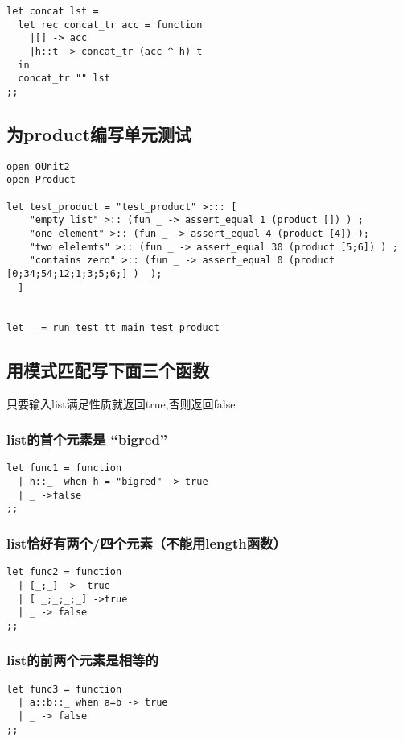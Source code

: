 \documentclass[11pt]{article}
\begin{document}
\begin{verbatim}
let concat lst =
  let rec concat_tr acc = function
    |[] -> acc
    |h::t -> concat_tr (acc ^ h) t 
  in 
  concat_tr "" lst
;;
\end{verbatim}

\subsection{为product编写单元测试}
\label{sec:org4300685}
\begin{verbatim}
open OUnit2
open Product

let test_product = "test_product" >::: [
    "empty list" >:: (fun _ -> assert_equal 1 (product []) ) ;
    "one element" >:: (fun _ -> assert_equal 4 (product [4]) );
    "two elelemts" >:: (fun _ -> assert_equal 30 (product [5;6]) ) ;
    "contains zero" >:: (fun _ -> assert_equal 0 (product [0;34;54;12;1;3;5;6;] )  );
  ]


let _ = run_test_tt_main test_product
\end{verbatim}




\subsection{用模式匹配写下面三个函数}
\label{sec:org368f9d0}

只要输入list满足性质就返回true,否则返回false

\subsubsection{list的首个元素是 “bigred”}
\label{sec:orga1631b4}
\begin{verbatim}
let func1 = function
  | h::_  when h = "bigred" -> true
  | _ ->false
;;
\end{verbatim}

\subsubsection{list恰好有两个/四个元素（不能用length函数）}
\label{sec:orgdf25dfa}
\begin{verbatim}
let func2 = function
  | [_;_] ->  true
  | [ _;_;_;_] ->true
  | _ -> false
;;
\end{verbatim}

\subsubsection{list的前两个元素是相等的}
\label{sec:orgafdebd4}
\begin{verbatim}
let func3 = function
  | a::b::_ when a=b -> true
  | _ -> false
;;
\end{verbatim}
\end{document}
